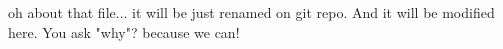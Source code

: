 oh
about that file...
it will be just renamed on git repo.
And it will be modified here.
You ask "why"?
because we can!